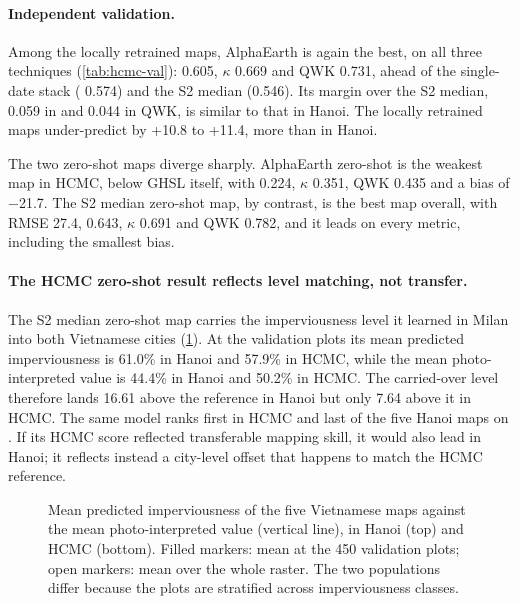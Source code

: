 \paragraph{Independent validation.} Among the locally retrained maps,
AlphaEarth is again the best, on all three techniques (\cref{tab:hcmc-val}):
\Rsq{} 0.605, $\kappa$ 0.669 and QWK 0.731, ahead of the single-date stack
(\Rsq{} 0.574) and the S2 median (0.546). Its margin over the S2 median,
0.059 in \Rsq{} and 0.044 in QWK, is similar to that in Hanoi. The locally
retrained maps under-predict by +10.8 to +11.4\pp, more than in Hanoi.

The two zero-shot maps diverge sharply. AlphaEarth zero-shot is the weakest
map in HCMC, below GHSL itself, with \Rsq{} 0.224, $\kappa$ 0.351, QWK 0.435
and a bias of $-$21.7\pp. The S2 median zero-shot map, by contrast, is the
best map overall, with RMSE 27.4\pp, \Rsq{} 0.643, $\kappa$ 0.691 and QWK
0.782, and it leads on every metric, including the smallest bias.

\paragraph{The HCMC zero-shot result reflects level matching, not
transfer.} The S2 median zero-shot map carries the imperviousness level it
learned in Milan into both Vietnamese cities (\cref{fig:level}). At the
validation plots its mean predicted imperviousness is 61.0\% in Hanoi and
57.9\% in HCMC, while the mean photo-interpreted value is 44.4\% in Hanoi
and 50.2\% in HCMC. The carried-over level therefore lands 16.61\pp{} above
the reference in Hanoi but only 7.64\pp{} above it in HCMC. The same model
ranks first in HCMC and last of the five Hanoi maps on \Rsq. If its HCMC
score reflected transferable mapping skill, it would also lead in Hanoi; it
reflects instead a city-level offset that happens to match the HCMC
reference.

\begin{figure}[htbp]
  \centering
  \caption{Mean predicted imperviousness of the five Vietnamese maps against
  the mean photo-interpreted value (vertical line), in Hanoi (top) and HCMC
  (bottom). Filled markers: mean at the 450 validation plots; open markers:
  mean over the whole raster. The two populations differ because the plots
  are stratified across imperviousness classes.}
  \label{fig:level}
\end{figure}

